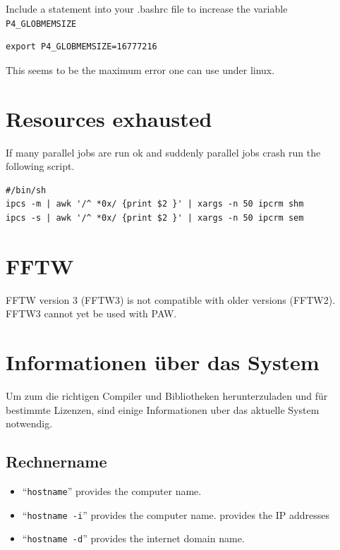 \documentclass[a4paper,10pt]{report}
\newcommand{\mytt}[1]{{\tt #1}}
\begin{document}
Include a statement into your .bashrc file to increase the variable
\mytt{P4\_GLOBMEMSIZE}
\begin{verbatim}
export P4_GLOBMEMSIZE=16777216
\end{verbatim}
This seems to be the maximum error one can use under linux.


\section{Resources exhausted}
If many parallel jobs are run ok and suddenly parallel jobs crash run the following script.
\begin{verbatim}
#/bin/sh
ipcs -m | awk '/^ *0x/ {print $2 }' | xargs -n 50 ipcrm shm
ipcs -s | awk '/^ *0x/ {print $2 }' | xargs -n 50 ipcrm sem
\end{verbatim}

\section{FFTW}

FFTW version 3 (FFTW3) is not compatible with older versions
(FFTW2). FFTW3 cannot yet be used with PAW.

\section{Informationen \"uber das System}
Um zum die richtigen Compiler und Bibliotheken herunterzuladen und
f\"ur bestimmte Lizenzen, sind einige Informationen uber das aktuelle
System notwendig.

\subsection{Rechnername}
\begin{itemize}
\item  ``\mytt{hostname}'' provides the computer name.
\item  ``\mytt{hostname -i}'' provides the computer name. provides the IP addresses
\item  ``\mytt{hostname -d}'' provides the internet domain name.
\end{itemize}
\end{document}
